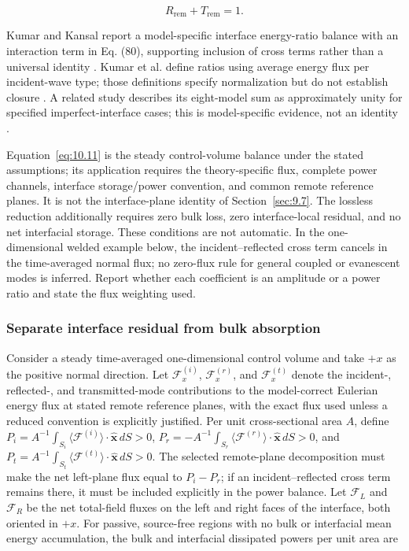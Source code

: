 \begin{equation}
R_{\mathrm{rem}} + T_{\mathrm{rem}} = 1.
\label{eq:10.12}
\end{equation}

Kumar and Kansal report a model-specific interface energy-ratio balance with an interaction term in Eq. (80), supporting inclusion of cross terms rather than a universal identity \cite{KumarKansal2017}. Kumar et al. define ratios using average energy flux per incident-wave type; those definitions specify normalization but do not establish closure \cite{Kumar2024}. A related study describes its eight-model sum as approximately unity for specified imperfect-interface cases; this is model-specific evidence, not an identity \cite{Kumar2024a}.

Equation~\eqref{eq:10.11} is the steady control-volume balance under the stated assumptions; its application requires the theory-specific flux, complete power channels, interface storage/power convention, and common remote reference planes. It is not the interface-plane identity of Section~\ref{sec:9.7}. The lossless reduction additionally requires zero bulk loss, zero interface-local residual, and no net interfacial storage. These conditions are not automatic. In the one-dimensional welded example below, the incident--reflected cross term cancels in the time-averaged normal flux; no zero-flux rule for general coupled or evanescent modes is inferred. Report whether each coefficient is an amplitude or a power ratio and state the flux weighting used.

\subsubsection{Separate interface residual from bulk absorption}

Consider a steady time-averaged one-dimensional control volume and take $+x$ as the positive normal direction. Let $\mathcal{F}_x^{(i)}$, $\mathcal{F}_x^{(r)}$, and $\mathcal{F}_x^{(t)}$ denote the incident-, reflected-, and transmitted-mode contributions to the model-correct Eulerian energy flux at stated remote reference planes, with the exact flux used unless a reduced convention is explicitly justified. Per unit cross-sectional area $A$, define $P_i=A^{-1}\int_{S_i}\langle\mathcal{F}^{(i)}\rangle\cdot\hat{\bm{x}}\,dS>0$, $P_r=-A^{-1}\int_{S_r}\langle\mathcal{F}^{(r)}\rangle\cdot\hat{\bm{x}}\,dS>0$, and $P_t=A^{-1}\int_{S_t}\langle\mathcal{F}^{(t)}\rangle\cdot\hat{\bm{x}}\,dS>0$. The selected remote-plane decomposition must make the net left-plane flux equal to $P_i-P_r$; if an incident--reflected cross term remains there, it must be included explicitly in the power balance. Let $\mathcal{F}_L$ and $\mathcal{F}_R$ be the net total-field fluxes on the left and right faces of the interface, both oriented in $+x$. For passive, source-free regions with no bulk or interfacial mean energy accumulation, the bulk and interfacial dissipated powers per unit area are

